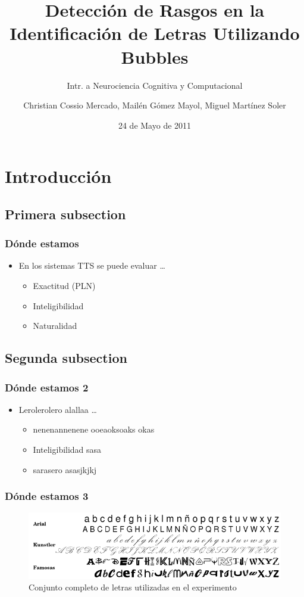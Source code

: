 \documentclass[10pt,presentation]{beamer}
\title{Detecci\'on de Rasgos en la Identificaci\'on de Letras Utilizando Bubbles}
\subtitle{Intr. a Neurociencia Cognitiva y Computacional}
\author[Cossio Mercado, Gomez Mayol, Martinez Soler]{Christian Cossio Mercado, Mail\'en G\'omez Mayol, Miguel Mart\'inez Soler}
\institute{Departamento de Computación - FCEyN, UBA}
\date{24 de Mayo de 2011}
\begin{document}
\begin{frame}%
  \titlepage
\end{frame}

\section{Introducci\'on}
\subsection{Primera subsection}
\begin{frame}
  \frametitle{Dónde estamos}
  \begin{itemize}
    \item En los sistemas TTS se puede evaluar \ldots \pause
    \begin{itemize}
      \item Exactitud (PLN) \pause
      \item Inteligibilidad \pause
      \item Naturalidad
    \end{itemize}
\end{itemize}
\end{frame}

\subsection{Segunda subsection}
\begin{frame}
  \frametitle{Dónde estamos 2}
  \begin{itemize}
    \item Lerolerolero alallaa  \ldots \pause
    \begin{itemize}
      \item nenenannenene ooeaoksoaks okas \pause
      \item Inteligibilidad sasa \pause
      \item sarasero asasjkjkj
    \end{itemize}
\end{itemize}
\end{frame}

\begin{frame}
  \frametitle{Dónde estamos 3}
    \begin{figure}
    \includegraphics[scale=0.35]{graficos/letras.png}
      \caption{Conjunto completo de letras utilizadas en el experimento}
      \label{figura:conjuntoLetras}
    \end{figure}
\end{frame}
\end{document}
